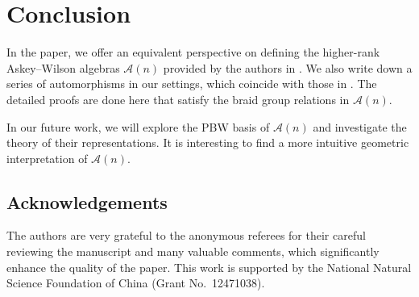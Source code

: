 \documentclass[pdftex]{sigma}
\numberwithin{equation}{section}
\def\A{\mathscr{A}}
\begin{document}
\section{Conclusion}

In the paper, we offer an equivalent perspective on defining the higher-rank Askey--Wilson algebras $\A(n)$ provided by the authors in \cite{CFPR(2023)}. We also write down a series of automorphisms in our settings, which coincide with those in \cite{CFPR(2023)}. The detailed proofs are done here that satisfy the braid group relations in $\A(n)$.

In our future work, we will explore the PBW basis of $\A(n)$ and investigate the theory of their representations.
It is interesting to find a more intuitive geometric interpretation of $\A(n)$.

\subsection*{Acknowledgements}
The authors are very grateful to the anonymous referees for their careful reviewing the man\-u\-script and many valuable comments, which significantly enhance the quality of the paper. This work is supported by the National Natural Science Foundation of China (Grant No.\ 12471038).
\end{document}
